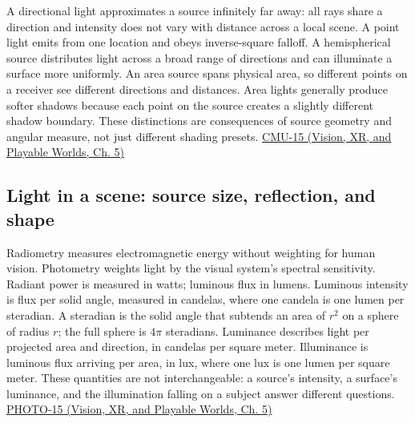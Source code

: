 \hypertarget{03-visual-computing-i-ch004-directional-hemispherical-and-area-lights}{}

A directional light approximates a source infinitely far away: all rays share a direction and intensity does not vary with distance across a local scene. A point light emits from one location and obeys inverse-square falloff. A hemispherical source distributes light across a broad range of directions and can illuminate a surface more uniformly. An area source spans physical area, so different points on a receiver see different directions and distances. Area lights generally produce softer shadows because each point on the source creates a slightly different shadow boundary. These distinctions are consequences of source geometry and angular measure, not just different shading presets. \href{../07-Vision-XR-and-Playable-Worlds/main.pdf\#nameddest=04-visual-computing-ii-ch036-cmu-15---radiometry}{CMU-15 (Vision, XR, and Playable Worlds, Ch. 5)}

\subsection{Light in a scene: source size, reflection, and shape}\label{03-visual-computing-i-ch004-light-in-a-scene-source-size-reflection-and-shape}

\hypertarget{03-visual-computing-i-ch004-light-in-a-scene-source-size-reflection-and-shape}{}

Radiometry measures electromagnetic energy without weighting for human vision. Photometry weights light by the visual system's spectral sensitivity. Radiant power is measured in watts; luminous flux in lumens. Luminous intensity is flux per solid angle, measured in candelas, where one candela is one lumen per steradian. A steradian is the solid angle that subtends an area of \(r^2\) on a sphere of radius \(r\); the full sphere is \(4\pi\) steradians. Luminance describes light per projected area and direction, in candelas per square meter. Illuminance is luminous flux arriving per area, in lux, where one lux is one lumen per square meter. These quantities are not interchangeable: a source's intensity, a surface's luminance, and the illumination falling on a subject answer different questions. \href{../07-Vision-XR-and-Playable-Worlds/main.pdf\#nameddest=04-visual-computing-ii-ch036-photo-15---photography-session-15}{PHOTO-15 (Vision, XR, and Playable Worlds, Ch. 5)}

